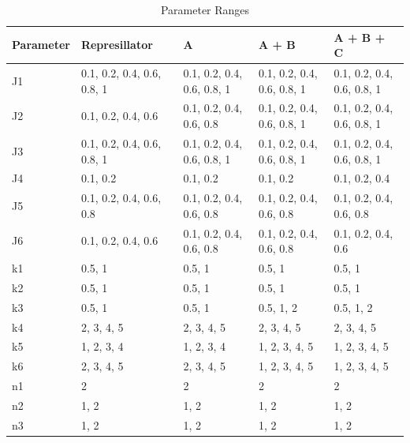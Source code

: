 \documentclass{article}
\begin{document}
\begin{table}[H]
\centering
\begin{tabular}{|l|l|l|l|l|}
\hline
\textbf{Parameter} & \textbf{Represillator} & \textbf{A} & \textbf{A + B} & \textbf{A + B + C}\\
\hline
J1 & 0.1, 0.2, 0.4, 0.6, 0.8, 1 & 0.1, 0.2, 0.4, 0.6, 0.8, 1 & 0.1, 0.2, 0.4, 0.6, 0.8, 1 & 0.1, 0.2, 0.4, 0.6, 0.8, 1 \\
J2 & 0.1, 0.2, 0.4, 0.6 & 0.1, 0.2, 0.4, 0.6, 0.8 & 0.1, 0.2, 0.4, 0.6, 0.8, 1 & 0.1, 0.2, 0.4, 0.6, 0.8, 1 \\
J3 & 0.1, 0.2, 0.4, 0.6, 0.8, 1 & 0.1, 0.2, 0.4, 0.6, 0.8, 1 & 0.1, 0.2, 0.4, 0.6, 0.8, 1 & 0.1, 0.2, 0.4, 0.6, 0.8, 1 \\
J4 & 0.1, 0.2 & 0.1, 0.2 & 0.1, 0.2 & 0.1, 0.2, 0.4 \\
J5 & 0.1, 0.2, 0.4, 0.6, 0.8 & 0.1, 0.2, 0.4, 0.6, 0.8 & 0.1, 0.2, 0.4, 0.6, 0.8 & 0.1, 0.2, 0.4, 0.6, 0.8 \\
J6 & 0.1, 0.2, 0.4, 0.6 & 0.1, 0.2, 0.4, 0.6, 0.8 & 0.1, 0.2, 0.4, 0.6, 0.8 & 0.1, 0.2, 0.4, 0.6 \\
k1 & 0.5, 1 & 0.5, 1 & 0.5, 1 & 0.5, 1 \\
k2 & 0.5, 1 & 0.5, 1 & 0.5, 1 & 0.5, 1 \\
k3 & 0.5, 1 & 0.5, 1 & 0.5, 1, 2 & 0.5, 1, 2 \\
k4 & 2, 3, 4, 5 & 2, 3, 4, 5 & 2, 3, 4, 5 & 2, 3, 4, 5 \\
k5 & 1, 2, 3, 4 & 1, 2, 3, 4 & 1, 2, 3, 4, 5 & 1, 2, 3, 4, 5 \\
k6 & 2, 3, 4, 5 & 2, 3, 4, 5 & 1, 2, 3, 4, 5 & 1, 2, 3, 4, 5 \\
n1 & 2 & 2 & 2 & 2 \\
n2 & 1, 2 & 1, 2 & 1, 2 & 1, 2 \\
n3 & 1, 2 & 1, 2 & 1, 2 & 1, 2 \\
\hline
\end{tabular}
\caption{Parameter Ranges}
\end{table}
\end{document}
